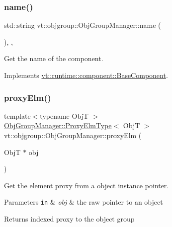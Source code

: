 \subsubsection{\texorpdfstring{name()}{name()}}
{\footnotesize\ttfamily std\+::string vt\+::objgroup\+::\+Obj\+Group\+Manager\+::name (\begin{DoxyParamCaption}{ }\end{DoxyParamCaption})\hspace{0.3cm}{\ttfamily [inline]}, {\ttfamily [override]}, {\ttfamily [virtual]}}



Get the name of the component. 



Implements \hyperlink{structvt_1_1runtime_1_1component_1_1_base_component_a7701485f3539f78d42e6bad47fc7eb78}{vt\+::runtime\+::component\+::\+Base\+Component}.

\mbox{\label{structvt_1_1objgroup_1_1_obj_group_manager_a31f00bd509986001e3154af24239f24d}} 
\subsubsection{\texorpdfstring{proxy\+Elm()}{proxyElm()}}
{\footnotesize\ttfamily template$<$typename ObjT $>$ \\
\hyperlink{structvt_1_1objgroup_1_1_obj_group_manager_adba6c8ecb0f4c30e719f1abb995cfc9b}{Obj\+Group\+Manager\+::\+Proxy\+Elm\+Type}$<$ ObjT $>$ vt\+::objgroup\+::\+Obj\+Group\+Manager\+::proxy\+Elm (\begin{DoxyParamCaption}\item[{ObjT $\ast$}]{obj }\end{DoxyParamCaption})}



Get the element proxy from a object instance pointer. 


\begin{DoxyParams}[1]{Parameters}
\mbox{\tt in}  & {\em obj} & the raw pointer to an object\\
\hline
\end{DoxyParams}
\begin{DoxyReturn}{Returns}
indexed proxy to the object group 
\end{DoxyReturn}
\mbox{\label{structvt_1_1objgroup_1_1_obj_group_manager_ae794f79a67e0a916b175ab9853185339}} 

